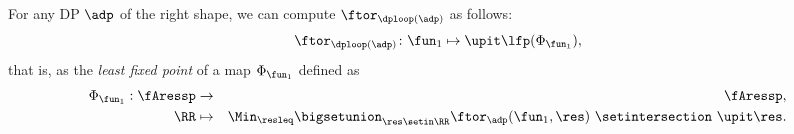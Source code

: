 \begin{theorem}
    \label{prop:loop-continuous}
    For any DP $\adp$ of the right shape, we can compute $ \ftor_{\dploop(\adp)}$ as follows:
    \begin{equation}
        \label{eq:loop_fixpoint1}
        \ftor_{\dploop(\adp)}\colon\fun_{1}\mapsto\upit\lfp(\Phi_{\fun_{1}}),
    \end{equation}
    that is, as the \emph{least fixed point} of a map $\Phi_{\fun_{1}}$ defined as
    \begin{eqnarray}
        \Phi_{\fun_{1}}:\fAressp & \to     & \fAressp,\label{eq:bigphi1} \\
        \RR                      & \mapsto & \Min_{\resleq}\bigsetunion_{\res\setin\RR}\ftor_{\adp}(\fun_{1}, \res)\ \setintersection\ \upit\res.
        \nonumber
    \end{eqnarray}
\end{theorem}
